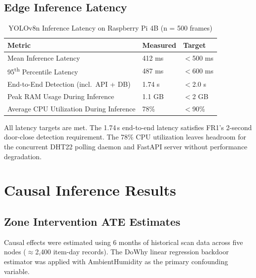 \documentclass[12pt,a4paper]{report}
\begin{document}
\subsection{Edge Inference Latency}

\begin{table}[ht]
\centering
\caption{YOLOv8n Inference Latency on Raspberry Pi 4B (n = 500 frames)}
\label{tab:latency}
\begin{tabularx}{\textwidth}{L{0.52\textwidth} C{0.20\textwidth} C{0.20\textwidth}}
\toprule
\textbf{Metric} & \textbf{Measured} & \textbf{Target} \\
\midrule
Mean Inference Latency & 412 ms & $<$500 ms \\
95\textsuperscript{th} Percentile Latency & 487 ms & $<$600 ms \\
End-to-End Detection (incl.\ API + DB) & 1.74 s & $<$2.0 s \\
Peak RAM Usage During Inference & 1.1 GB & $<$2 GB \\
Average CPU Utilization During Inference & 78\% & $<$90\% \\
\bottomrule
\end{tabularx}
\end{table}

All latency targets are met. The 1.74\,s end-to-end latency satisfies FR1's 2-second door-close detection requirement. The 78\% CPU utilization leaves headroom for the concurrent DHT22 polling daemon and FastAPI server without performance degradation.

\section{Causal Inference Results}

\subsection{Zone Intervention ATE Estimates}

Causal effects were estimated using 6 months of historical scan data across five nodes ($\approx$2,400 item-day records). The DoWhy linear regression backdoor estimator was applied with AmbientHumidity as the primary confounding variable.
\end{document}
